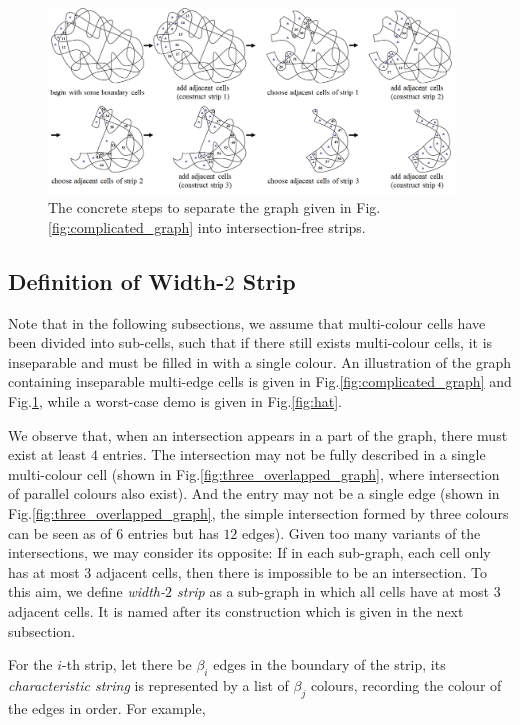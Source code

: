 \documentclass[conference]{IEEEtran}
\begin{document}
\begin{figure}[t]
\centering
\includegraphics[width=0.96\textwidth]{figures/complicated_graph/steps}
\caption{The concrete steps to separate the graph given in Fig.\ref{fig:complicated_graph} into intersection-free strips. }\label{fig:steps}
\end{figure}



\subsection{Definition of Width-$2$ Strip}
Note that in the following subsections, we assume that multi-colour cells have been divided into sub-cells, such that if there still exists multi-colour cells, it is inseparable and must be filled in with a single colour. An illustration of the graph containing inseparable multi-edge cells is given in Fig.\ref{fig:complicated_graph} and Fig.\ref{fig:steps}, while a worst-case demo is given in Fig.\ref{fig:hat}. 

We observe that, when an intersection appears in a part of the graph, there must exist at least $4$ entries. 
The intersection may not be fully described in a single multi-colour cell (shown in Fig.\ref{fig:three_overlapped_graph}, where intersection of parallel colours also exist). 
And the entry may not be a single edge (shown in Fig.\ref{fig:three_overlapped_graph}, the simple intersection formed by three colours can be seen as of $6$ entries but has $12$ edges).  
Given too many variants of the intersections, we may consider its opposite: If in each sub-graph, each cell only has at most $3$ adjacent cells, then there is impossible to be an intersection. 
To this aim, we define \textit{width-$2$ strip} as a sub-graph in which all cells have at most $3$ adjacent cells. 
It is named after its construction which is given in the next subsection. 

For the $i$-th strip, let there be $\beta_i$ edges in the boundary of the strip, its \textit{characteristic string} is represented by a list of $\beta_j$ colours, recording the colour of the edges in order. 
For example, 
\end{document}
